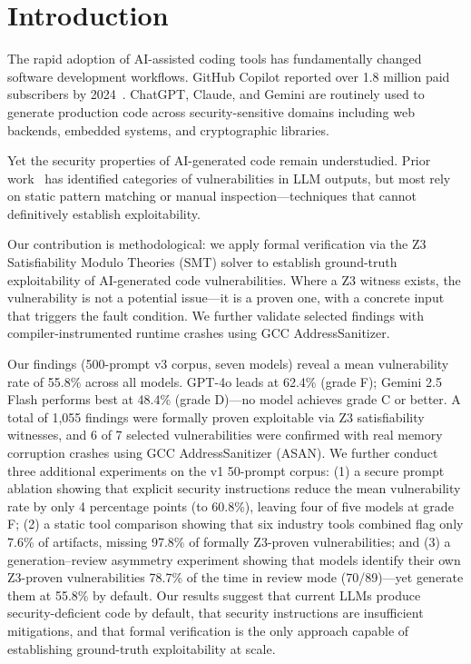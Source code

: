 \documentclass[10pt,twocolumn]{article}
\begin{document}
\section{Introduction}

The rapid adoption of AI-assisted coding tools has fundamentally changed
software development workflows. GitHub Copilot reported over 1.8 million
paid subscribers by 2024~\cite{github2024}. ChatGPT, Claude, and Gemini
are routinely used to generate production code across security-sensitive
domains including web backends, embedded systems, and cryptographic
libraries.

Yet the security properties of AI-generated code remain understudied.
Prior work~\cite{pearce2022,sandoval2023,tony2023} has identified
categories of vulnerabilities in LLM outputs, but most rely on static
pattern matching or manual inspection---techniques that cannot
definitively establish exploitability.

Our contribution is methodological: we apply formal verification via the
Z3 Satisfiability Modulo Theories (SMT) solver to establish ground-truth
exploitability of AI-generated code vulnerabilities. Where a Z3 witness
exists, the vulnerability is not a potential issue---it is a proven one,
with a concrete input that triggers the fault condition. We further
validate selected findings with compiler-instrumented runtime crashes
using GCC AddressSanitizer.

Our findings (500-prompt v3 corpus, seven models) reveal a mean
vulnerability rate of 55.8\% across all models. GPT-4o leads at 62.4\%
(grade F); Gemini 2.5 Flash performs best at 48.4\% (grade D)---no
model achieves grade C or better. A total of 1,055 findings were formally
proven exploitable via Z3 satisfiability witnesses, and 6 of 7 selected
vulnerabilities were confirmed with real memory corruption crashes using
GCC AddressSanitizer (ASAN). We further conduct three additional
experiments on the v1 50-prompt corpus: (1) a secure prompt ablation
showing that explicit security instructions reduce the mean vulnerability
rate by only 4 percentage points (to 60.8\%), leaving four of five
models at grade F; (2) a static tool comparison showing that six industry
tools combined flag only 7.6\% of artifacts, missing 97.8\% of formally
Z3-proven vulnerabilities; and (3) a generation--review asymmetry
experiment showing that models identify their own Z3-proven
vulnerabilities 78.7\% of the time in review mode (70/89)---yet generate
them at 55.8\% by default. Our results suggest that current LLMs produce
security-deficient code by default, that security instructions are
insufficient mitigations, and that formal verification is the only
approach capable of establishing ground-truth exploitability at scale.
\end{document}
